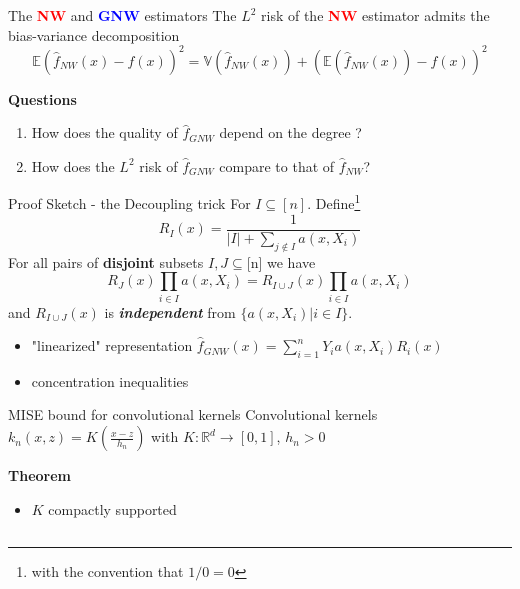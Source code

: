 \documentclass[final,dvipsnames]{beamer}
\newcommand{\myemphh}[1]{\textbf{\textcolor{blue}{#1}}}
\newcommand{\myemphr}[1]{\textbf{\textcolor{red}{#1}}}
\newcommand{\mycolbackwhite}[1]{
\hspace*{.01\linewidth}\begin{minipage}{.96\linewidth}
\begin{mdframed}[backgroundcolor=white!10,linewidth=3pt]
\vspace{10pt}
#1
\vspace{10pt}
\end{mdframed}
\end{minipage}
}
\newcommand{\mycolbackgreenw}[1]{
\hspace*{.01\linewidth}\begin{minipage}{.96\linewidth}
\begin{mdframed}[backgroundcolor=blue!10,linewidth=1pt]
\vspace{10pt}
#1
\vspace{10pt}
\end{mdframed}
\end{minipage}
}
\begin{document}
\begin{frame}
\begin{columns}[T]
\begin{column}{0.49\textwidth}
\begin{block}{The \myemphr{NW} and \myemphh{GNW} estimators}
The $L^2$ risk of the \myemphr{NW} estimator admits the bias-variance decomposition 
\vspace{10pt}
\begin{equation*}
    \mathbb{E}(\hat{f}_{NW}(x)-f(x))^2=\mathbb{V}(\hat{f}_{NW}(x))+(\mathbb{E}(\hat{f}_{NW}(x))-f(x))^2
\end{equation*}
\mycolbackgreenw{\textbf{Questions}
\vspace{10pt}
\begin{center}
    \begin{enumerate}
        \item How does the quality of $\hat{f}_{GNW}$ depend on the degree ?
        \vspace{10pt}
        \item How does the $L^2$ risk of $\hat{f}_{GNW}$ compare to that of $\hat{f}_{NW}$?
    \end{enumerate}
\end{center}
}
\end{block}
\begin{block}{Proof Sketch - the Decoupling trick}
   \small For $I\subseteq [n]$. Define\footnote{with the convention that $1/0=0$}  
    \small \begin{equation*}
        R_I(x)=
        \frac{1}{|I|+\sum_{j\notin I}a(x,X_i)}
    \end{equation*}
    \small For all pairs of \textbf{disjoint} subsets $I,J\subseteq$[n] we have
    \begin{equation*}
    R_J(x)\prod_{i\in I}a(x,X_i)=R_{I\cup J}(x)\prod_{i\in I}a(x,X_i)
    \end{equation*}
    \small and $R_{I\cup J}(x)$ is \textbf{\textit{independent}} from $\{a(x,X_i)|i\in I\}$.
    \vspace{20pt}
    \begin{itemize}
        \small \item "linearized" representation 
     $\hat{f}_{GNW}(x)=\sum_{i=1}^nY_ia(x,X_i)R_i(x)$ 
        \small \item concentration inequalities
    \end{itemize}
\end{block}
\begin{block}{MISE bound for convolutional kernels}
    Convolutional kernels $k_n(x,z)=K(\frac{x-z}{h_n})$ with $K\colon\mathbb{R}^d\to [0,1]$, $h_n>0$
    \mycolbackwhite{\textbf{Theorem}
    \vspace{10pt}
    \begin{itemize}
        \item $K$ compactly supported 

\end{itemize}}
\end{block}
\end{column}
\end{columns}
\end{frame}
\end{document}
